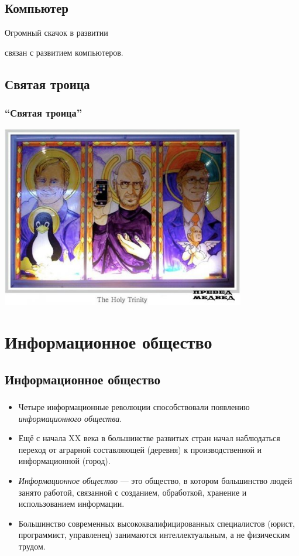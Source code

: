 \documentclass[compress,red]{beamer}
\begin{document}
\subsection{Компьютер}
\begin{frame}
  \begin{center}
    \Huge{Огромный скачок в развитии}
    
    \Large{связан с развитием компьютеров.}
  \end{center}
\end{frame}

\subsection{Святая троица}
\begin{frame}[fragile]
  \frametitle{``Святая троица''}
  \centerline{\includegraphics[width=0.8\textwidth]{images/holy_trinity.jpg}}
\end{frame}

\section{Информационное общество}
\subsection{Информационное общество}
\begin{frame}[fragile]
  \frametitle{}
  \begin{itemize}
    \item Четыре информационные революции способствовали появлению \emph{информационного общества}.
    \item Ещё с начала XX века в большинстве развитых стран начал наблюдаться переход от аграрной составляющей (деревня) к производственной и информационной (город).
    \item \emph{Информационное общество} --- это общество, в котором большинство людей занято работой, связанной с созданием, обработкой, хранение и использованием информации.
    \item Большинство современных высококвалифицированных специалистов (юрист, программист, управленец) занимаются интеллектуальным, а не физическим трудом.
  \end{itemize}
\end{frame}
\end{document}
